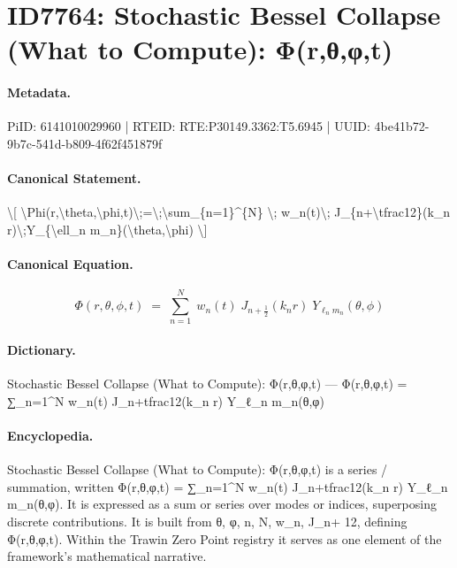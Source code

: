 \section*{ID7764: Stochastic Bessel Collapse (What to Compute): Φ(r,θ,φ,t)}
\paragraph{Metadata.}
PiID: 6141010029960 | RTEID: RTE:P30149.3362:T5.6945 | UUID: 4be41b72-9b7c-541d-b809-4f62f451879f

\paragraph{Canonical Statement.}
\textbackslash{}[ \textbackslash{}Phi(r,\textbackslash{}theta,\textbackslash{}phi,t)\textbackslash{};=\textbackslash{};\textbackslash{}sum\_\{n=1\}\textasciicircum{}\{N\} \textbackslash{}; w\_n(t)\textbackslash{}; J\_\{n+\textbackslash{}tfrac12\}(k\_n r)\textbackslash{};Y\_\{\textbackslash{}ell\_n m\_n\}(\textbackslash{}theta,\textbackslash{}phi) \textbackslash{}]

\paragraph{Canonical Equation.}
\[
\Phi(r,\theta,\phi,t)\;=\;\sum_{n=1}^{N} \; w_n(t)\; J_{n+\tfrac12}(k_n r)\;Y_{\ell_n m_n}(\theta,\phi)
\]

\paragraph{Dictionary.}
Stochastic Bessel Collapse (What to Compute): Φ(r,θ,φ,t) — Φ(r,θ,φ,t) = ∑\_n=1\textasciicircum{}N w\_n(t) J\_n+tfrac12(k\_n r) Y\_ℓ\_n m\_n(θ,φ)

\paragraph{Encyclopedia.}
Stochastic Bessel Collapse (What to Compute): Φ(r,θ,φ,t) is a series / summation, written Φ(r,θ,φ,t) = ∑\_n=1\textasciicircum{}N w\_n(t) J\_n+tfrac12(k\_n r) Y\_ℓ\_n m\_n(θ,φ). It is expressed as a sum or series over modes or indices, superposing discrete contributions. It is built from θ, φ, n, N, w\_n, J\_n+ 12, defining Φ(r,θ,φ,t). Within the Trawin Zero Point registry it serves as one element of the framework's mathematical narrative.
